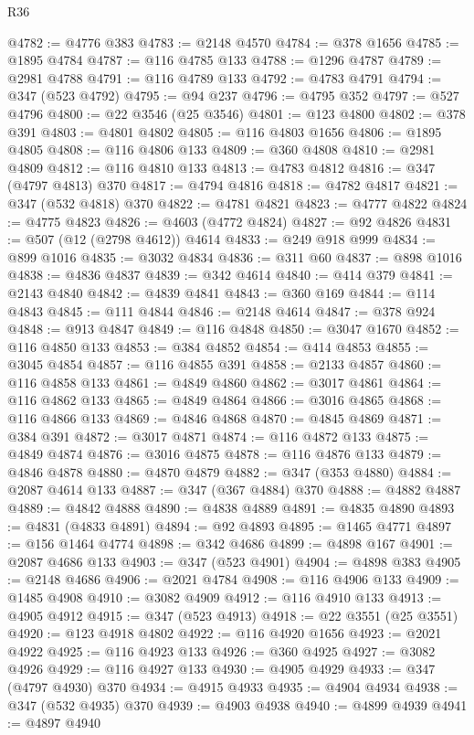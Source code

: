 \begin{lexlean}{R36}
\begin{coremodule}
@4782 := @4776 @383
@4783 := @2148 @4570
@4784 := @378 @1656
@4785 := @1895 @4784
@4787 := @116 @4785 @133
@4788 := @1296 @4787
@4789 := @2981 @4788
@4791 := @116 @4789 @133
@4792 := @4783 @4791
@4794 := @347 (@523 @4792)
@4795 := @94 @237
@4796 := @4795 @352
@4797 := @527 @4796
@4800 := @22 @3546 (@25 @3546)
@4801 := @123 @4800
@4802 := @378 @391
@4803 := @4801 @4802
@4805 := @116 @4803 @1656
@4806 := @1895 @4805
@4808 := @116 @4806 @133
@4809 := @360 @4808
@4810 := @2981 @4809
@4812 := @116 @4810 @133
@4813 := @4783 @4812
@4816 := @347 (@4797 @4813) @370
@4817 := @4794 @4816
@4818 := @4782 @4817
@4821 := @347 (@532 @4818) @370
@4822 := @4781 @4821
@4823 := @4777 @4822
@4824 := @4775 @4823
@4826 := @4603 (@4772 @4824)
@4827 := @92 @4826
@4831 := @507 (@12 (@2798 @4612)) @4614
@4833 := @249 @918 @999
@4834 := @899 @1016
@4835 := @3032 @4834
@4836 := @311 @60
@4837 := @898 @1016
@4838 := @4836 @4837
@4839 := @342 @4614
@4840 := @414 @379
@4841 := @2143 @4840
@4842 := @4839 @4841
@4843 := @360 @169
@4844 := @114 @4843
@4845 := @111 @4844
@4846 := @2148 @4614
@4847 := @378 @924
@4848 := @913 @4847
@4849 := @116 @4848
@4850 := @3047 @1670
@4852 := @116 @4850 @133
@4853 := @384 @4852
@4854 := @414 @4853
@4855 := @3045 @4854
@4857 := @116 @4855 @391
@4858 := @2133 @4857
@4860 := @116 @4858 @133
@4861 := @4849 @4860
@4862 := @3017 @4861
@4864 := @116 @4862 @133
@4865 := @4849 @4864
@4866 := @3016 @4865
@4868 := @116 @4866 @133
@4869 := @4846 @4868
@4870 := @4845 @4869
@4871 := @384 @391
@4872 := @3017 @4871
@4874 := @116 @4872 @133
@4875 := @4849 @4874
@4876 := @3016 @4875
@4878 := @116 @4876 @133
@4879 := @4846 @4878
@4880 := @4870 @4879
@4882 := @347 (@353 @4880)
@4884 := @2087 @4614 @133
@4887 := @347 (@367 @4884) @370
@4888 := @4882 @4887
@4889 := @4842 @4888
@4890 := @4838 @4889
@4891 := @4835 @4890
@4893 := @4831 (@4833 @4891)
@4894 := @92 @4893
@4895 := @1465 @4771
@4897 := @156 @1464 @4774
@4898 := @342 @4686
@4899 := @4898 @167
@4901 := @2087 @4686 @133
@4903 := @347 (@523 @4901)
@4904 := @4898 @383
@4905 := @2148 @4686
@4906 := @2021 @4784
@4908 := @116 @4906 @133
@4909 := @1485 @4908
@4910 := @3082 @4909
@4912 := @116 @4910 @133
@4913 := @4905 @4912
@4915 := @347 (@523 @4913)
@4918 := @22 @3551 (@25 @3551)
@4920 := @123 @4918 @4802
@4922 := @116 @4920 @1656
@4923 := @2021 @4922
@4925 := @116 @4923 @133
@4926 := @360 @4925
@4927 := @3082 @4926
@4929 := @116 @4927 @133
@4930 := @4905 @4929
@4933 := @347 (@4797 @4930) @370
@4934 := @4915 @4933
@4935 := @4904 @4934
@4938 := @347 (@532 @4935) @370
@4939 := @4903 @4938
@4940 := @4899 @4939
@4941 := @4897 @4940

\end{coremodule}
\end{lexlean}
